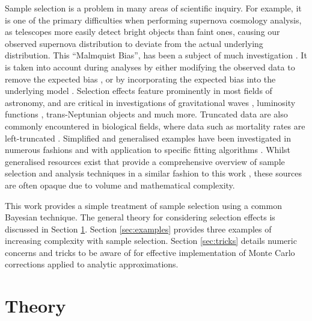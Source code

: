 \documentclass[a4paper,fleqn,usenatbib]{mnras}
\begin{document}
Sample selection is a problem in many areas of scientific inquiry. For example, it is one of the primary difficulties when performing supernova cosmology analysis, as telescopes more easily detect bright objects than faint ones, causing our observed supernova distribution to deviate from the actual underlying distribution. This  ``Malmquist Bias'', has been a subject of much investigation \citep{Butkevich2005}. It is taken into account during analyses by either modifying the observed data to remove the expected bias \citep{BetouleKessler2014, ConleyGuySullivan2011}, or by incorporating the expected bias into the underlying model \citep{Rubin2015}. Selection effects feature prominently in most fields of astronomy, and are critical in investigations of gravitational waves \citep{MessengerVeitch2013, AbbottAbbott2016}, luminosity functions \citep{MarshallTananbaum1983, KellyFan2008, BuchnerGeorgakakis2015}, trans-Neptunian objects \citep{Loredo2004} and much more.  Truncated data are also commonly encountered in biological fields, where data such as mortality rates are left-truncated \citep{JANE1898}. Simplified and generalised examples have been investigated in numerous fashions \citep{woodroofe1985estimating, Gull1989bayesian, grogger1991models, o1995truncated} and with application to specific fitting algorithms \citep{Gelfand1992, Liang2010}. Whilst generalised resources exist that provide a comprehensive overview of sample selection and analysis techniques in a similar fashion to this work \citep{klein2005survival, andreon2015bayesian}, these sources are often opaque due to volume and mathematical complexity. 

This work provides a simple treatment of sample selection using a common Bayesian technique. The general theory for considering selection effects is discussed in Section \ref{sec:theory}. Section \ref{sec:examples} provides three examples of increasing complexity with sample selection. Section \ref{sec:tricks} details numeric concerns and tricks to be aware of for effective implementation of Monte Carlo corrections applied to analytic approximations.






\section{Theory}
\label{sec:theory}
\end{document}
